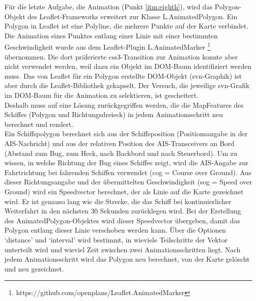 Für díe letzte Aufgabe, die Animation (Punkt \ref{itm:eighth}), wird das Polygon-Objekt des Leaflet-Frameworks erweitert zur Klasse L.AnimatedPolygon. Ein Polygon in Leaflet ist eine Polyline, die mehrere Punkte auf der Karte verbindet. Die Animation eines Punktes entlang einer Linie mit einer bestimmten Geschwindigkeit wurde aus dem Leaflet-Plugin L.AnimatedMarker \footnote{https://github.com/openplans/Leaflet.AnimatedMarker} übernommen. Die dort präferierte css3-Transition zur Animation konnte aber nicht verwendet werden, weil dazu ein Objekt im DOM-Baum identifiziert werden muss. Das von Leaflet für ein Polygon erstellte DOM-Objekt (svn-Graphik) ist aber durch die Leaflet-Bibliothek gekapselt. Der Versuch, die jeweilige svn-Grafik im DOM-Baum für die Animation zu selektieren, ist gescheitert. \\
Deshalb muss auf eine Lösung zurückgegriffen werden, die die MapFeatures des Schiffes (Polygon und Richtungsdreieck) in jedem Animationsschritt neu berechnet und rendert.\\
Ein Schiffspolygon berechnet sich aus der Schiffsposition (Positionsangabe in der AIS-Nachricht) und aus der relativen Position des AIS-Transceivers an Bord (Abstand zum Bug, zum Heck, nach Backbord und nach Steuerbord). Um zu wissen, in welche Richtung der Bug eines Schiffes zeigt, wird die AIS-Angabe zur Fahrtrichtung  bei fahrenden Schiffen verwendet (cog = Course over Ground). Aus dieser Richtungsangabe und der übermittelten Geschwindigkeit (sog = Speed over Ground) wird ein Speedvector berechnet, der als Linie auf die Karte gezeichnet wird. Er ist genauso lang wie die Strecke, die das Schiff bei kontinuierlicher Weiterfahrt in den nächsten 30 Sekunden zurücklegen wird. Bei der Erstellung des AnimatedPolygon-Objektes wird dieser Speedvector übergeben, damit das Polygon entlang dieser Linie verschoben werden kann. Über die Optionen ‘distance’ und ‘interval’ wird bestimmt, in wieviele Teilschritte der Vektor unterteilt wird und wieviel Zeit zwischen zwei Animationsschritten liegt. Nach jedem Animationsschritt wird das Polygon neu berechnet, von der Karte gelöscht und neu gezeichnet.

\newpage
